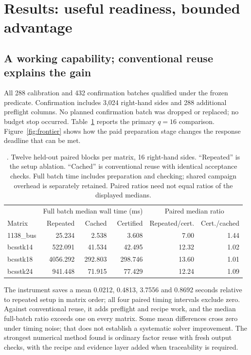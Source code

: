 \section{Results: useful readiness, bounded advantage}
\subsection{A working capability; conventional reuse explains the gain}
All 288 calibration and 432 confirmation batches qualified under the frozen predicate. Confirmation includes 3,024 right-hand sides and 288 additional preflight columns. No planned confirmation batch was dropped or replaced; no budget stop occurred. Table~\ref{tab:numerical} reports the primary $q=16$ comparison. Figure~\ref{fig:frontier} shows how the paid preparation stage changes the response deadline that can be met.

\begin{table}[ht]\centering\small
\begin{tabular*}{\linewidth}{@{\extracolsep{\fill}}lrrrrr@{}}\toprule
& \multicolumn{3}{c}{Full batch median wall time (ms)} & \multicolumn{2}{c}{Paired median ratio}\\
Matrix & Repeated & Cached & Certified & Repeated/cert. & Cert./cached\\\midrule
1138\_bus & 25.234 & 2.538 & 3.608 & 7.00 & 1.44\\
bcsstk14 & 522.091 & 41.534 & 42.495 & 12.32 & 1.02\\
bcsstk18 & 4056.292 & 292.803 & 298.746 & 13.60 & 1.01\\
bcsstk24 & 941.448 & 71.915 & 77.429 & 12.24 & 1.09\\
\bottomrule\end{tabular*}
\caption{\obs{}. Twelve held-out paired blocks per matrix, 16 right-hand sides. ``Repeated'' is the setup ablation. ``Cached'' is conventional reuse with identical acceptance checks. Full batch time includes preparation and checking; shared campaign overhead is separately retained. Paired ratios need not equal ratios of the displayed medians.}
\label{tab:numerical}\end{table}

The instrument saves a mean 0.0212, 0.4813, 3.7556 and 0.8692 seconds relative to repeated setup in matrix order; all four paired timing intervals exclude zero. Against conventional reuse, it adds preflight and recipe work, and the median full-batch ratio exceeds one on every matrix. Some mean differences cross zero under timing noise; that does not establish a systematic solver improvement. The strongest numerical method found is ordinary factor reuse with fresh output checks, with the recipe and evidence layer added when traceability is required.

